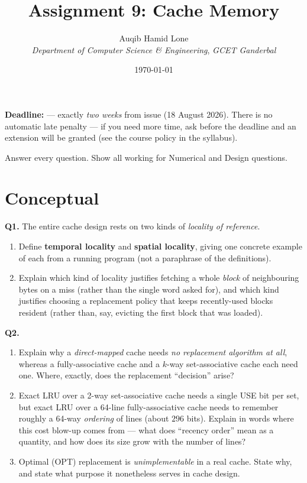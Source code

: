 \documentclass[11pt]{article}
\title{Assignment 9: Cache Memory}
\author{Auqib Hamid Lone\\[0.3em]
  \emph{Department of Computer Science \& Engineering}, \emph{GCET Ganderbal}}
\date{\today}
\begin{document}
\maketitle

\noindent\textbf{Deadline:}  --- exactly \emph{two weeks} from issue (18 August 2026). There is no automatic late penalty --- if you need more time, ask before the deadline and an extension will be granted (see the course policy in the syllabus).

\noindent Answer every question. Show all working for Numerical and Design questions.

\section{Conceptual}

\textbf{Q1.} The entire cache design rests on two kinds of \emph{locality of reference}.
\begin{enumerate}
  \item[(a)] Define \textbf{temporal locality} and \textbf{spatial locality}, giving one concrete example of each from a running program (not a paraphrase of the definitions).
  \item[(b)] Explain which kind of locality justifies fetching a whole \emph{block} of neighbouring bytes on a miss (rather than the single word asked for), and which kind justifies choosing a replacement policy that keeps recently-used blocks resident (rather than, say, evicting the first block that was loaded).
\end{enumerate}

\textbf{Q2.}
\begin{enumerate}
  \item[(a)] Explain why a \emph{direct-mapped} cache needs \emph{no replacement algorithm at all}, whereas a fully-associative cache and a $k$-way set-associative cache each need one. Where, exactly, does the replacement ``decision'' arise?
  \item[(b)] Exact LRU over a 2-way set-associative cache needs a single USE bit per set, but exact LRU over a 64-line fully-associative cache needs to remember roughly a 64-way \emph{ordering} of lines (about $296$ bits). Explain in words where this cost blow-up comes from --- what does ``recency order'' mean as a quantity, and how does its size grow with the number of lines?
  \item[(c)] Optimal (OPT) replacement is \emph{unimplementable} in a real cache. State why, and state what purpose it nonetheless serves in cache design.
\end{enumerate}
\end{document}
